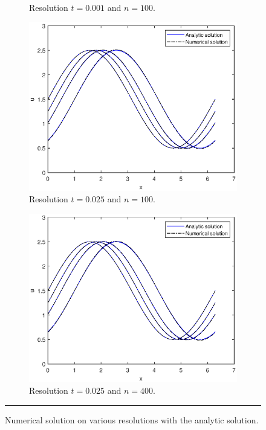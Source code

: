 \documentclass[a4paper, 12pt]{article}
\begin{document}
\begin{figure}[H]
\begin{subfigure}[b]{0.5\textwidth}
\caption{Resolution $t=0.001$ and $n=100$.}%
\end{subfigure}
\begin{subfigure}[b]{0.5\textwidth}
\includegraphics[width=\textwidth]{Q1_t=0.025n=100}\hfill
\caption{Resolution $t=0.025$ and $n=100$.}%
\end{subfigure}
\begin{subfigure}[b]{0.5\textwidth}
\includegraphics[width=\textwidth]{Q1_t=0.025n=400}\hfill
\caption{Resolution $t=0.025$ and $n=400$.}%
\end{subfigure}
\caption{Numerical solution on various resolutions with the analytic solution.}
\rule{\linewidth}{.4pt}
\end{figure}  
\end{document}
